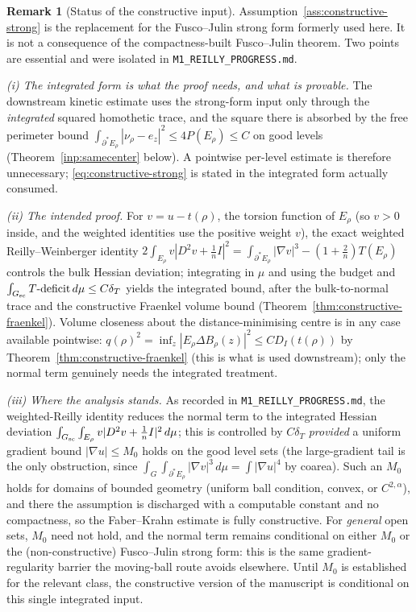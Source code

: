 \documentclass[11pt]{amsart}
\theoremstyle{definition}
\newtheorem{remark}[theorem]{Remark}
\newcommand{\dT}{\delta_T}
\newcommand{\Per}{P}
\begin{document}
\begin{remark}[Status of the constructive input]
\label{rem:constructive-strong-status}
Assumption~\ref{ass:constructive-strong} is the replacement for the Fusco--Julin
strong form formerly used here.  It is not a consequence of the
compactness-built Fusco--Julin theorem.  Two points are essential and were
isolated in \texttt{M1\_REILLY\_PROGRESS.md}.

\emph{(i) The integrated form is what the proof needs, and what is provable.}
The downstream kinetic estimate uses the strong-form input only through the
\emph{integrated} squared homothetic trace, and the square there is absorbed by
the free perimeter bound \(\int_{\partial^*E_\rho}|\nu_\rho-e_z|^2\le4\Per(E_\rho)
\le C\) on good levels (Theorem~\ref{inp:samecenter} below).  A pointwise
per-level estimate is therefore unnecessary; \eqref{eq:constructive-strong} is
stated in the integrated form actually consumed.

\emph{(ii) The intended proof.} For \(v=u-t(\rho)\), the torsion function of
\(E_\rho\) (so \(v>0\) inside, and the weighted identities use the positive
weight \(v\)), the exact weighted Reilly--Weinberger identity
\(2\int_{E_\rho}v|D^2v+\tfrac1n I|^2=\int_{\partial^*E_\rho}|\nabla v|^3
-(1+\tfrac2n)T(E_\rho)\) controls the bulk Hessian deviation; integrating in
\(\mu\) and using the budget and \(\int_{G_{\rm sc}}T\text{-deficit}\,d\mu\le
C\dT\) yields the integrated bound, after the bulk-to-normal trace and the
constructive Fraenkel volume bound (Theorem~\ref{thm:constructive-fraenkel}).
Volume closeness about the distance-minimising centre is in any case available
pointwise: \(q(\rho)^2=\inf_z|E_\rho\Delta B_\rho(z)|^2\le CD_I(t(\rho))\) by
Theorem~\ref{thm:constructive-fraenkel} (this is what is used downstream); only
the normal term genuinely needs the integrated treatment.

\emph{(iii) Where the analysis stands.}  As recorded in
\texttt{M1\_REILLY\_PROGRESS.md}, the weighted-Reilly identity reduces the
normal term to the integrated Hessian deviation \(\int_{G_{\rm sc}}
\int_{E_\rho}v|D^2v+\tfrac1n I|^2\,d\mu\); this is controlled by \(C\dT\)
\emph{provided} a uniform gradient bound \(|\nabla u|\le M_0\) holds on the good
level sets (the large-gradient tail is the only obstruction, since
\(\int_G\int_{\partial^*E_\rho}|\nabla v|^3\,d\mu=\int|\nabla u|^4\) by coarea).
Such an \(M_0\) holds for domains of bounded geometry (uniform ball condition,
convex, or \(C^{2,\alpha}\)), and there the assumption is discharged with a
computable constant and no compactness, so the Faber--Krahn estimate is fully
constructive.  For \emph{general} open sets, \(M_0\) need not hold, and the
normal term remains conditional on either \(M_0\) or the (non-constructive)
Fusco--Julin strong form: this is the same gradient-regularity barrier the
moving-ball route avoids elsewhere.  Until \(M_0\) is established for the
relevant class, the constructive version of the manuscript is conditional on
this single integrated input.
\end{remark}
\end{document}

